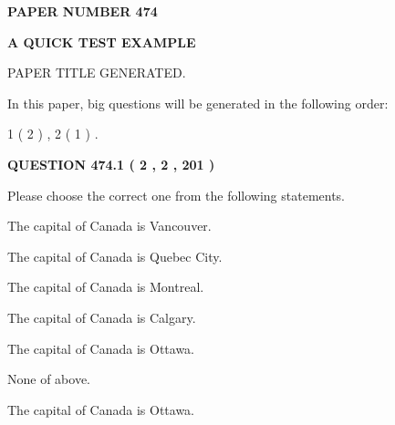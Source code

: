 \documentclass[12pt]{article}
\begin{document}
   
   
   
\newpage 
\setcounter{page}{ 
   474001 } 
   
   
   
   
 {\textbf{ \Large{ PAPER NUMBER  474  }}}
   
   
\vspace{0.2in}
   
   
   
   
   
   
   
   
 \vspace{0.2in}
{\LARGE {\textbf{ A QUICK TEST EXAMPLE}}}
   
   
 PAPER TITLE GENERATED.
   
   
   
\vspace{0.2in}
   
In this paper, big questions will be generated in the following order: 
   
   
   1 ( 2 )
 ,
   2 ( 1 )
 .
  
\vspace{0.2in}
  
{\textbf{\Large{QUESTION
474.1 
 ( 2 , 2 , 201 )
}}}
  
  
Please choose the correct one from the following statements.
 
 
The capital of Canada is Vancouver.
 
 
The capital of Canada is Quebec City.
 
 
The capital of Canada is Montreal.
 
 
The capital of Canada is Calgary.
 
 
The capital of Canada is Ottawa.
 
 
 None of above.
 
 
\noindent{}
 
 
The capital of Canada is Ottawa.
 
 
\noindent{}
 
 
   
\end{document}
